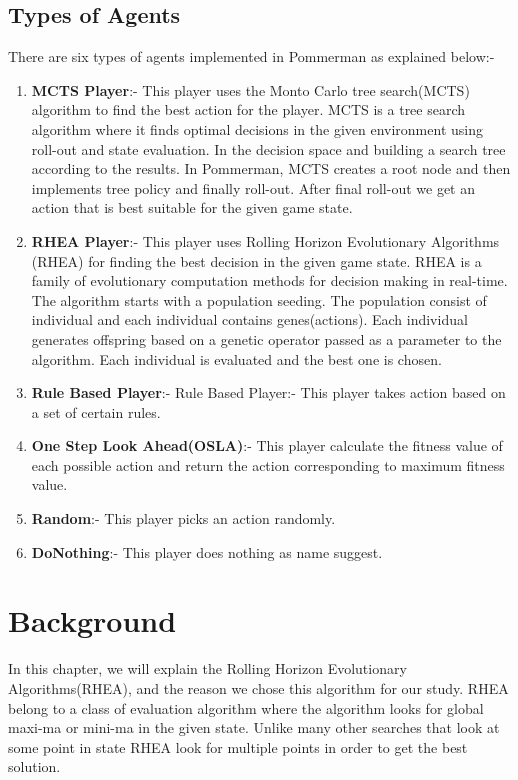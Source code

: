 \documentclass{report}
\begin{document}
	\section{Types of Agents}
	There are six types of agents implemented in Pommerman as explained below:- 
	\begin{enumerate}
	\item \textbf{MCTS Player}:- This player uses the Monto Carlo tree search(MCTS) algorithm to find the best action for the player. MCTS is a tree search algorithm where it finds optimal decisions in the given environment using roll-out and state evaluation. In the decision space and building a search tree according to the results\cite{browne2012survey}. In Pommerman, MCTS creates a root node and then implements tree policy and finally roll-out. After final roll-out we get an action that is best suitable for the given game state.
	\item \textbf{RHEA Player}:- This player uses Rolling Horizon Evolutionary Algorithms\cite{gaina2021rolling} (RHEA) for finding the best decision in the given game state. RHEA is a family of evolutionary computation methods for decision making in real-time. The algorithm starts with a population seeding. The population consist of individual and each individual contains genes(actions). Each individual generates offspring based on a genetic operator passed as a parameter to the algorithm. Each individual is evaluated and the best one is chosen\cite{slide}. 
	\item \textbf{Rule Based Player}:- {Rule Based Player}:- This player takes action based on a set of certain rules.
	\item \textbf{One Step Look Ahead(OSLA)}:- This player calculate the fitness value of each possible action and  return the action corresponding to maximum fitness value.
	\item\textbf{Random}:- This player picks an action randomly. 
	\item\textbf{DoNothing}:- This player does nothing as name suggest.
\end{enumerate}
	\chapter{Background}
	In this chapter, we will explain the Rolling Horizon Evolutionary Algorithms(RHEA), and the reason we chose this algorithm for our study. RHEA belong to a class of evaluation algorithm where the algorithm looks for global maxi-ma or mini-ma in the given state. Unlike many other searches that look at some point in state RHEA look for multiple points in order to get the best solution.
\end{document}
